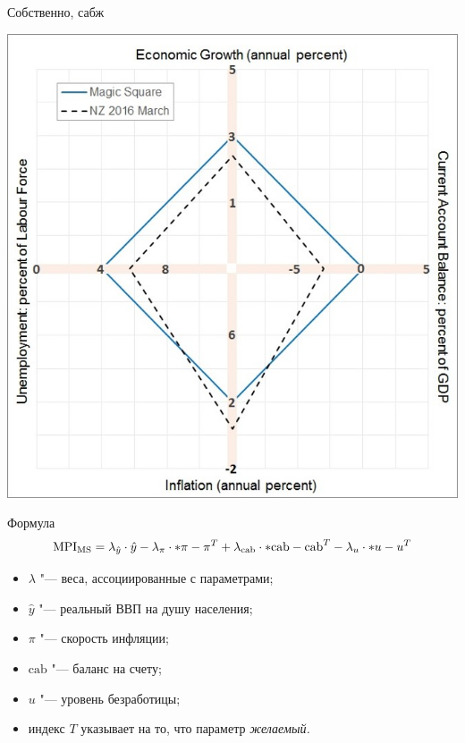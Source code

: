 \documentclass{beamer}
\let\abs\relax
\DeclarePairedDelimiter\abs{\lvert}{\rvert}
\begin{document}
	\begin{frame}{Собственно, сабж}
	
		\begin{center}
			\includegraphics[height = .8\textheight]{ms.jpg}
		\end{center}
		
	\end{frame}
	
	\begin{frame}{Формула}
			\[
				\mathrm{MPI_{MS}} = \lambda_{\hat{y}}\cdot\hat{y} - 
									\lambda_\pi\cdot\abs*{\pi-\pi^T} +
									\lambda_{\mathrm{cab}}\cdot\abs*{{\mathrm{cab}}-{\mathrm{cab}}^T} -
									\lambda_u\cdot\abs*{u-u^T}
			\]
			
			\begin{itemize}
			\item $\lambda$ "--- веса, ассоциированные с параметрами;
			\item $\hat{y}$ "--- реальный ВВП на душу населения;
			\item $\pi$ "--- скорость инфляции;
			\item $\mathrm{cab}$ "--- баланс на счету;
			\item $u$ "--- уровень безработицы;
			\item индекс $T$ указывает на то, что параметр \textit{желаемый.}
			\end{itemize}
			
	\end{frame}
\end{document}
